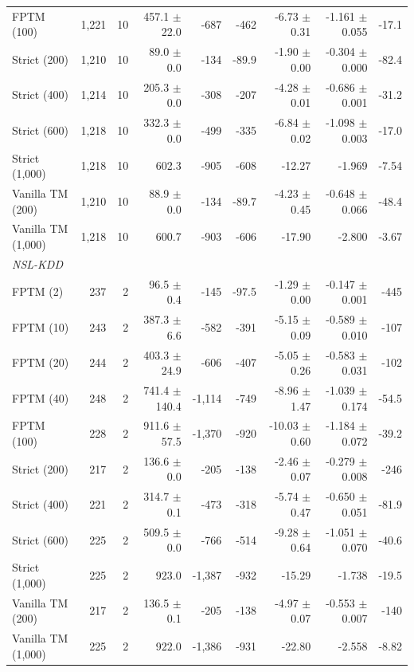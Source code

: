 \begin{tabular}{lrrrrrrrr}
FPTM (100) & 1,221 & 10 & 457.1 $\pm$ 22.0 & \hyp{687} & \hyp{462} & \hyp{6.73 $\pm$ 0.31} & \hyp{1.161 $\pm$ 0.055} & \hyp{17.1} \\
Strict (200) & 1,210 & 10 & 89.0 $\pm$ 0.0 & \hyp{134} & \hyp{89.9} & \hyp{1.90 $\pm$ 0.00} & \hyp{0.304 $\pm$ 0.000} & \hyp{82.4} \\
Strict (400) & 1,214 & 10 & 205.3 $\pm$ 0.0 & \hyp{308} & \hyp{207} & \hyp{4.28 $\pm$ 0.01} & \hyp{0.686 $\pm$ 0.001} & \hyp{31.2} \\
Strict (600) & 1,218 & 10 & 332.3 $\pm$ 0.0 & \hyp{499} & \hyp{335} & \hyp{6.84 $\pm$ 0.02} & \hyp{1.098 $\pm$ 0.003} & \hyp{17.0} \\
Strict (1,000) & 1,218 & 10 & 602.3 & \hyp{905} & \hyp{608} & \hyp{12.27} & \hyp{1.969} & \hyp{7.54} \\
Vanilla TM (200) & 1,210 & 10 & 88.9 $\pm$ 0.0 & \hyp{134} & \hyp{89.7} & \hyp{4.23 $\pm$ 0.45} & \hyp{0.648 $\pm$ 0.066} & \hyp{48.4} \\
Vanilla TM (1,000) & 1,218 & 10 & 600.7 & \hyp{903} & \hyp{606} & \hyp{17.90} & \hyp{2.800} & \hyp{3.67} \\
\midrule
\multicolumn{9}{l}{\textit{NSL-KDD}} \\
FPTM (2) & 237 & 2 & 96.5 $\pm$ 0.4 & \hyp{145} & \hyp{97.5} & \hyp{1.29 $\pm$ 0.00} & \hyp{0.147 $\pm$ 0.001} & \hyp{445} \\
FPTM (10) & 243 & 2 & 387.3 $\pm$ 6.6 & \hyp{582} & \hyp{391} & \hyp{5.15 $\pm$ 0.09} & \hyp{0.589 $\pm$ 0.010} & \hyp{107} \\
FPTM (20) & 244 & 2 & 403.3 $\pm$ 24.9 & \hyp{606} & \hyp{407} & \hyp{5.05 $\pm$ 0.26} & \hyp{0.583 $\pm$ 0.031} & \hyp{102} \\
FPTM (40) & 248 & 2 & 741.4 $\pm$ 140.4 & \hyp{1,114} & \hyp{749} & \hyp{8.96 $\pm$ 1.47} & \hyp{1.039 $\pm$ 0.174} & \hyp{54.5} \\
FPTM (100) & 228 & 2 & 911.6 $\pm$ 57.5 & \hyp{1,370} & \hyp{920} & \hyp{10.03 $\pm$ 0.60} & \hyp{1.184 $\pm$ 0.072} & \hyp{39.2} \\
Strict (200) & 217 & 2 & 136.6 $\pm$ 0.0 & \hyp{205} & \hyp{138} & \hyp{2.46 $\pm$ 0.07} & \hyp{0.279 $\pm$ 0.008} & \hyp{246} \\
Strict (400) & 221 & 2 & 314.7 $\pm$ 0.1 & \hyp{473} & \hyp{318} & \hyp{5.74 $\pm$ 0.47} & \hyp{0.650 $\pm$ 0.051} & \hyp{81.9} \\
Strict (600) & 225 & 2 & 509.5 $\pm$ 0.0 & \hyp{766} & \hyp{514} & \hyp{9.28 $\pm$ 0.64} & \hyp{1.051 $\pm$ 0.070} & \hyp{40.6} \\
Strict (1,000) & 225 & 2 & 923.0 & \hyp{1,387} & \hyp{932} & \hyp{15.29} & \hyp{1.738} & \hyp{19.5} \\
Vanilla TM (200) & 217 & 2 & 136.5 $\pm$ 0.1 & \hyp{205} & \hyp{138} & \hyp{4.97 $\pm$ 0.07} & \hyp{0.553 $\pm$ 0.007} & \hyp{140} \\
Vanilla TM (1,000) & 225 & 2 & 922.0 & \hyp{1,386} & \hyp{931} & \hyp{22.80} & \hyp{2.558} & \hyp{8.82} \\
\bottomrule
\end{tabular}

